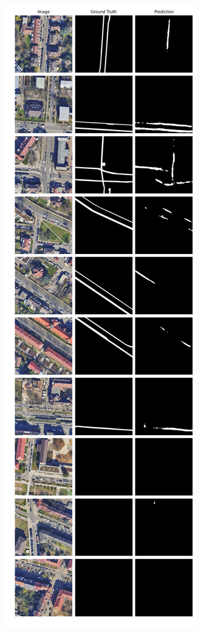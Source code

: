 	\begin{figure}
	\centering
	\begin{subfigure}{.4\textwidth}
		\centering
		\includegraphics[width=1.\textwidth]{Bilder/Samples-KA/vbunet-r.png} 

\end{subfigure}
\end{figure}
